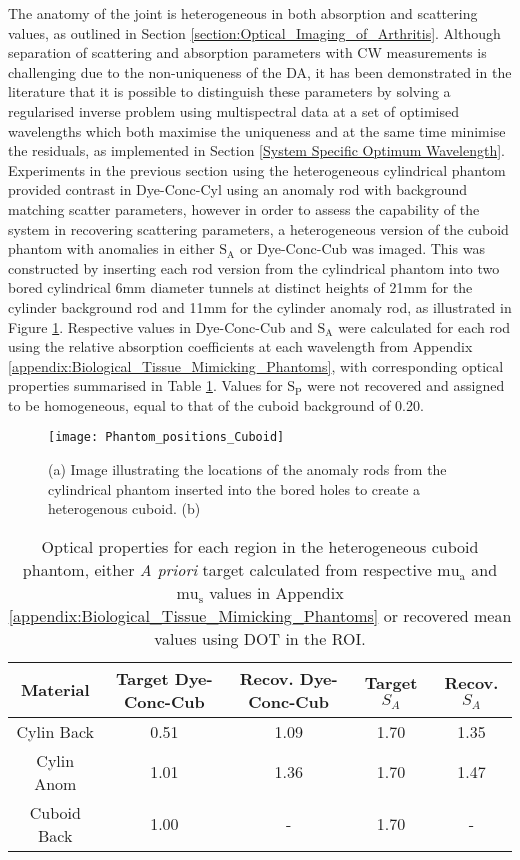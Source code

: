 \documentclass[twoside]{bhamthesis}
\theoremstyle{definition}
\begin{document}
The anatomy of the joint is heterogeneous in both absorption and scattering values, as outlined in Section \ref{section:Optical_Imaging_of_Arthritis}. Although separation of scattering and absorption parameters with CW measurements is challenging due to the non-uniqueness of the DA, it has been demonstrated in the literature that it is possible to distinguish these parameters by solving a regularised inverse problem using multispectral data at a set of optimised wavelengths which both maximise the uniqueness and at the same time minimise the residuals, as implemented in Section \ref{System Specific Optimum Wavelength}. Experiments in the previous section using the heterogeneous cylindrical phantom provided contrast in Dye-Conc-Cyl using an anomaly rod with background matching scatter parameters, however in order to assess the capability of the system in recovering scattering parameters, a heterogeneous version of the cuboid phantom with anomalies in either $\mathrm{S_A}$ or Dye-Conc-Cub was imaged. This was constructed by inserting each rod version from the cylindrical phantom into two bored cylindrical 6mm diameter tunnels at distinct heights of 21mm for the cylinder background rod and 11mm for the cylinder anomaly rod, as illustrated in Figure \ref{fig:Phantom_positions_Cuboid}. Respective values in Dye-Conc-Cub and $\mathrm{S_A}$ were calculated for each rod using the relative absorption coefficients at each wavelength from Appendix \ref{appendix:Biological_Tissue_Mimicking_Phantoms}, with corresponding optical properties summarised in Table \ref{tab:Cuboid Phantom contrast Table}. Values for $\mathrm{S_P}$ were not recovered and assigned to be homogeneous, equal to that of the cuboid background of 0.20. 

\begin{figure}[!ht]
\texttt{[image: Phantom\_positions\_Cuboid]}
\centering
\caption{(a) Image illustrating the locations of the anomaly rods from the cylindrical phantom inserted  into the bored holes to create a heterogenous cuboid. (b) }
\label{fig:Phantom_positions_Cuboid}
\end{figure}

\bgroup
\def\arraystretch{1.2}
\begin{table}[!ht]
\small
\begin{center}
 \begin{tabular}{c c c c c} 
 \hline
 Material & Target Dye-Conc-Cub & Recov. Dye-Conc-Cub & Target $S_A$ & Recov. $S_A$ \\  
 \hline
 Cylin Back & 0.51 & 1.09 & 1.70  & 1.35 \\
 Cylin Anom  & 1.01 & 1.36 & 1.70 & 1.47  \\
 Cuboid Back & 1.00 & - & 1.70 & - \\
 \hline
\end{tabular}
\caption{Optical properties for each region in the heterogeneous cuboid phantom, either \textit{A priori} target calculated from respective $\mathrm{mu_a}$ and $\mathrm{mu_s}$ values in Appendix \ref{appendix:Biological_Tissue_Mimicking_Phantoms} or recovered mean values using DOT in the ROI. 
 }
\label{tab:Cuboid Phantom contrast Table}
\end{center}
\end{table}
\egroup
\end{document}
